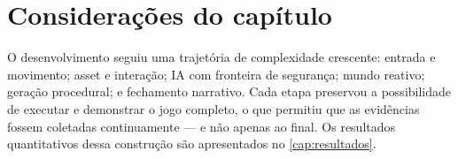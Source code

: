 \section{Considerações do capítulo}
\label{sec:consideracoes_desenvolvimento}

O desenvolvimento seguiu uma trajetória de complexidade crescente: entrada e
movimento; asset e interação; IA com fronteira de segurança; mundo reativo;
geração procedural; e fechamento narrativo. Cada etapa preservou a
possibilidade de executar e demonstrar o jogo completo, o que permitiu que as
evidências fossem coletadas continuamente --- e não apenas ao final. Os
resultados quantitativos dessa construção são apresentados no
\autoref{cap:resultados}.
